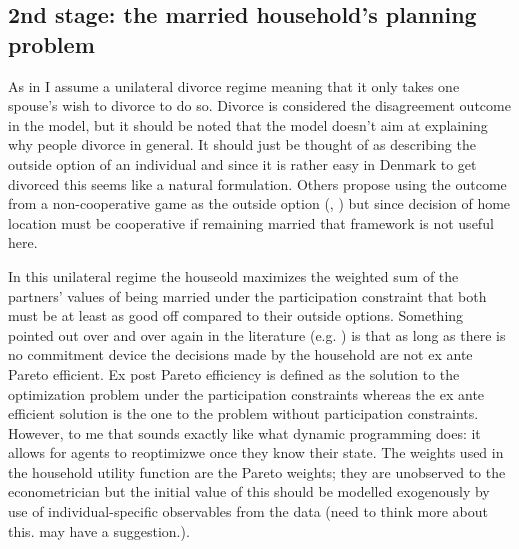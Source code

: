 \subsection{2nd stage: the married household's planning problem}
As in \cite{Voena2015} I assume a unilateral divorce regime meaning that it only takes one spouse's wish to divorce to do so. Divorce is considered the disagreement outcome in the model, but it should be noted that the model doesn't aim at explaining why people divorce in general. It should just be thought of as describing the outside option of an individual and since it is rather easy in Denmark to get divorced this seems like a natural formulation. Others propose using the outcome from a non-cooperative game as the outside option (\cite{LundbergPollak1993}, \cite{DelbocaFlinn2012}) but since decision of home location must be cooperative if remaining married that framework is not useful here. 

In this unilateral regime the houseold maximizes the weighted sum of the partners' values of being married under the participation constraint that both must be at least as good off compared to their outside options. Something pointed out over and over again in the literature (e.g. \cite{Galichon2011,LundbergPollak2003,Theloudis2016,Mazzoccoetal2013}) is that as long as there is no commitment device the decisions made by the household are not ex ante Pareto efficient. Ex post Pareto efficiency is defined as the solution to the optimization problem under the participation constraints whereas the ex ante efficient solution is the one to the problem without participation constraints. However, to me that sounds exactly like what dynamic programming does: it allows for agents to reoptimizwe once they know their state. The weights used in the household utility function are the Pareto weights; they are unobserved to the econometrician but the initial value of this should be modelled exogenously by use of individual-specific observables from the data (need to think more about this. \cite{DelbocaFlinn2012} may have a suggestion.).

